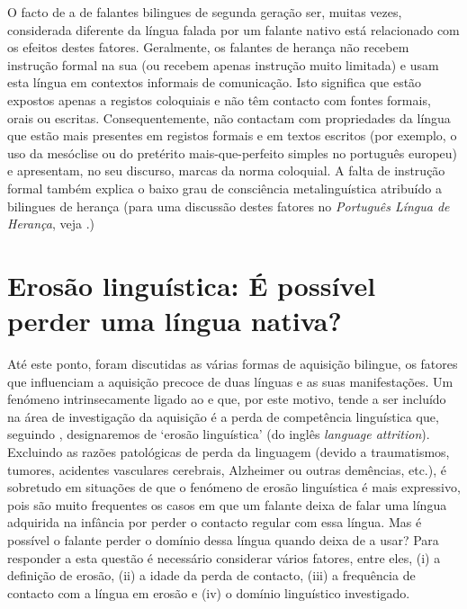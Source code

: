 \documentclass[output=paper]{LSP/langsci}
\begin{document}
O facto de a  de falantes bilingues de segunda geração ser, muitas vezes, considerada diferente da língua falada por um falante nativo está relacionado com os efeitos destes fatores. Geralmente, os falantes de herança não recebem instrução formal na sua  (ou recebem apenas instrução muito limitada) e usam esta língua em contextos informais de comunicação. Isto significa que estão expostos apenas a registos coloquiais e não têm contacto com fontes formais, orais ou escritas. Consequentemente, não contactam com propriedades da língua que estão mais presentes em registos formais e em textos escritos (por exemplo, o uso da mesóclise ou do pretérito mais-que-perfeito simples no português europeu) e apresentam, no seu discurso, marcas da norma coloquial. A falta de instrução formal também explica o baixo grau de consciência metalinguística atribuído a bilingues de herança (para uma discussão destes fatores no \textit{Português Língua de Herança}, veja \citealt{flores2015}.)


\section{Erosão linguística: É possível perder uma língua nativa?}%
\label{sec:almeida_erosao}

Até este ponto, foram discutidas as várias formas de aquisição bilingue, os fatores que influenciam a aquisição precoce de duas línguas e as suas manifestações. Um fenómeno intrinsecamente ligado ao  e que, por este motivo, tende a ser incluído na área de investigação da aquisição é a perda de competência linguística que, seguindo \cite{flores2008}, designaremos de `erosão linguística' (do inglês \textit{language attrition}). Excluindo as razões patológicas de perda da linguagem (devido a traumatismos, tumores, acidentes vasculares cerebrais, Alzheimer ou outras demências, etc.), é sobretudo em situações de  que o fenómeno de erosão linguística é mais expressivo, pois são muito frequentes os casos em que um falante deixa de falar uma língua adquirida na infância por perder o contacto regular com essa língua. Mas é possível o falante perder o domínio dessa língua quando deixa de a usar? Para responder a esta questão é necessário considerar vários fatores, entre eles, (i) a definição de erosão, (ii) a idade da perda de contacto, (iii) a frequência de contacto com a língua em erosão e (iv) o domínio linguístico investigado.
\end{document}
